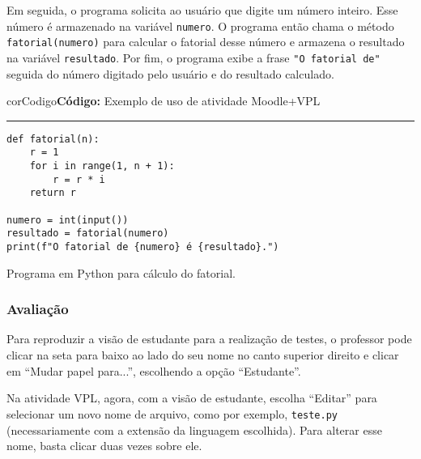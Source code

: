 Em seguida, o programa solicita ao usuário que digite um número inteiro. Esse número é armazenado na variável \verb|numero|. O programa então chama o método \verb|fatorial(numero)| para calcular o fatorial desse número e armazena o resultado na variável \verb|resultado|. Por fim, o programa exibe a frase \verb|"O fatorial de"| seguida do número digitado pelo usuário e do resultado calculado.





\begin{listing}[!ht]
\begin{myboxCode}{corCodigo}{\textbf{Código: } Exemplo de uso de atividade Moodle+VPL}\vspace{3mm}
\hrule
\begin{verbatim}
def fatorial(n):
    r = 1
    for i in range(1, n + 1):
        r = r * i
    return r

numero = int(input())
resultado = fatorial(numero)
print(f"O fatorial de {numero} é {resultado}.")
\end{verbatim}
\end{myboxCode}
\caption{Programa em Python para cálculo do fatorial.}
\label{lst:fatorial}
\end{listing}


\subsubsection{Avaliação}

Para reproduzir a visão de estudante para a realização de testes, o professor pode clicar na seta para baixo ao lado do seu nome no canto superior direito e clicar em ``Mudar papel para...'', escolhendo a opção ``Estudante''.

Na atividade VPL, agora, com a visão de estudante, escolha ``Editar'' para selecionar um novo nome de arquivo, como por exemplo, \verb|teste.py| (necessariamente com a extensão da linguagem escolhida). Para alterar esse nome, basta clicar duas vezes sobre ele.

